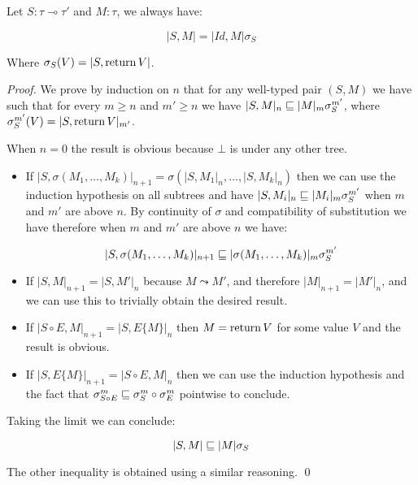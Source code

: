 \begin{lemma}
    \label{lem:stackcom}
    Let $S : \tau \multimap \tau'$ and $M : \tau$, we always have:

    \begin{equation*}
        |S, M| = |Id,M| \sigma_S
    \end{equation*}

    Where $\sigma_S (V) = |S, \operatorname{return} V|$.
\end{lemma}

\begin{proof}
    We prove by induction on $n$ that for any well-typed pair $(S,M)$ we have 
    such that for every $m \geq n$ and $m' \geq n$ 
    we have $|S,M|_n \sqsubseteq |M|_m \sigma^{m'}_S$, where 
    $\sigma^{m'}_S (V) = |S, \operatorname{return} V|_{m'}$.

    When $n=0$ the result is obvious because $\bot$ is under any other tree.

    \begin{itemize}
        \item If $|S,\sigma(M_1, \dots, M_k)|_{n+1} = \sigma (|S,M_1|_n, \dots,
            |S, M_k|_n)$ then we can use the induction hypothesis on all 
            subtrees and have $|S, M_i|_n \sqsubseteq |M_i|_m \sigma^{m'}_S$ when 
            $m$ and $m'$ are above $n$. By continuity of $\sigma$ and 
            compatibility of substitution we have therefore when $m$ and $m'$
            are above $n$ we have:

            \begin{equation*}
                |S, \sigma (M_1, \dots, M_k)|_{n+1} \sqsubseteq |\sigma(M_1, \dots,
                M_k)|_m \sigma^{m'}_S
            \end{equation*}

        \item If $|S, M|_{n+1} = |S, M'|_n$ because $M \leadsto M'$, and 
            therefore $|M|_{n+1} = |M'|_n$, and we can use this to trivially
            obtain the desired result.

        \item If $|S \circ E, M|_{n+1} = |S, E \{M\}|_n$ then 
            $M = \operatorname{return} V$ for some value $V$ and the result is obvious.

        \item If $|S, E\{M\}|_{n+1} = |S \circ E, M|_n$ then 
            we can use the induction hypothesis and the fact that 
            $\sigma^m_{S \circ E} \sqsubseteq \sigma^m_S \circ \sigma^m_E$ pointwise
            to conclude.
    \end{itemize}
    
    Taking the limit we can conclude:

    \begin{equation*}
        |S,M| \sqsubseteq |M| \sigma_S
    \end{equation*}
    
    The other inequality is obtained using a similar reasoning. 
\qed\end{proof}


